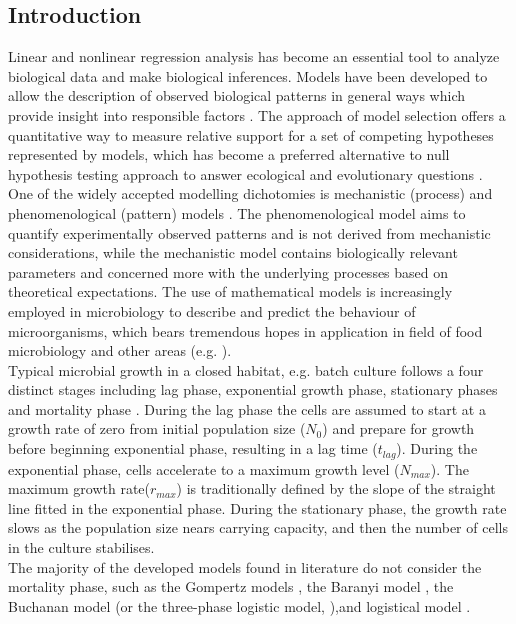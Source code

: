 \documentclass[a4paper,11pt]{article}
\theoremstyle{definition}
\begin{document}
\begin{linenumbers}
\section{Introduction}
Linear and nonlinear regression analysis has become an essential tool to analyze biological data and make biological inferences. Models have been developed to allow the description of observed biological patterns in general ways which provide insight into responsible factors \citep{johnson2004model}. The approach of model selection offers a quantitative way to measure relative support for a set of competing hypotheses represented by models, which has become a preferred alternative to null hypothesis testing approach to answer ecological and evolutionary questions \citep{hilborn1997ecological}. \\
One of the widely accepted modelling dichotomies is mechanistic (process) and phenomenological (pattern) models \citep{bolker2008ecological}. The phenomenological model aims to quantify experimentally observed patterns and is not derived from mechanistic considerations, while the mechanistic model contains biologically relevant parameters and concerned more with the underlying processes based on theoretical expectations. The use of mathematical models is increasingly employed in microbiology to describe and predict the behaviour of microorganisms, which bears tremendous hopes in application in field of food microbiology and other areas (e.g. \citealp{baranyi1995mathematics}).\\
Typical microbial growth in a closed habitat, e.g. batch culture follows a four distinct stages including lag phase, exponential growth phase, stationary phases and mortality phase \citep{mckellar2004primary}. During the lag phase
the cells are assumed to start at a growth rate of zero from initial population size ($N_{0}$) and prepare for growth before beginning exponential phase, resulting in a lag time ($t_{lag}$). During the exponential phase, cells accelerate to a maximum growth level ($N_{max}$). The maximum growth rate($r_{max}$) is traditionally defined by the slope of the straight line fitted in the exponential phase. During the stationary phase, the growth rate slows as the population size nears carrying capacity, and then the number of cells in the culture stabilises.\\
The majority of the developed models found in literature do not consider the mortality phase, such as the Gompertz models \citep{gibson1988predicting}, the Baranyi model \citep{baranyi1995mathematics}, the Buchanan model (or the three-phase logistic model, \citealp{buchanan1997simple}),and logistical model \citep{ricker1979growth}. \\

\end{linenumbers}
\end{document}
